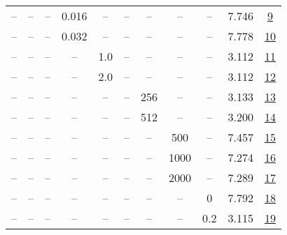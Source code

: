 \begin{table}[H]
\begin{tabular}{ccccccccccc}
-- & -- & -- & 0.016 & -- & -- & -- & -- & -- & 7.746 & \href{https://wandb.ai/stanford-mercury/optimizer-scaling/runs/sweep-520m-10B-mini743375lr0.016-wd0.1-minlr0-warmup4000-b10.9-b-71d93a}{9} \\
-- & -- & -- & 0.032 & -- & -- & -- & -- & -- & 7.778 & \href{https://wandb.ai/stanford-mercury/optimizer-scaling/runs/sweep-520m-10B-mini616d96lr0.032-wd0.1-minlr0-warmup4000-b10.9-b-6809c5}{10} \\
-- & -- & -- & -- & 1.0 & -- & -- & -- & -- & 3.112 & \href{https://wandb.ai/stanford-mercury/optimizer-scaling/runs/sweep-520m-10B-mini0dcb2clr0.004-wd0.1-minlr0-warmup4000-b10.9-b-87a5de}{11} \\
-- & -- & -- & -- & 2.0 & -- & -- & -- & -- & 3.112 & \href{https://wandb.ai/stanford-mercury/optimizer-scaling/runs/sweep-520m-10B-mini515ac5lr0.004-wd0.1-minlr0-warmup4000-b10.9-b-6bf049}{12} \\
-- & -- & -- & -- & -- & -- & 256 & -- & -- & 3.133 & \href{https://wandb.ai/stanford-mercury/optimizer-scaling/runs/sweep-520m-10B-minib57861lr0.004-wd0.1-minlr0-warmup4000-b10.9-b-a05b39}{13} \\
-- & -- & -- & -- & -- & -- & 512 & -- & -- & 3.200 & \href{https://wandb.ai/stanford-mercury/optimizer-scaling/runs/sweep-520m-10B-mini05d195lr0.004-wd0.1-minlr0-warmup4000-b10.9-b-f943f3}{14} \\
-- & -- & -- & -- & -- & -- & -- & 500 & -- & 7.457 & \href{https://wandb.ai/stanford-mercury/optimizer-scaling/runs/sweep-520m-10B-mini7194dalr0.004-wd0.1-minlr0-warmup500-b10.9-b2-4a47f7}{15} \\
-- & -- & -- & -- & -- & -- & -- & 1000 & -- & 7.274 & \href{https://wandb.ai/stanford-mercury/optimizer-scaling/runs/sweep-520m-10B-mini358c33lr0.004-wd0.1-minlr0-warmup1000-b10.9-b-ac8e20}{16} \\
-- & -- & -- & -- & -- & -- & -- & 2000 & -- & 7.289 & \href{https://wandb.ai/stanford-mercury/optimizer-scaling/runs/sweep-520m-10B-mini5326c8lr0.004-wd0.1-minlr0-warmup2000-b10.9-b-df18d8}{17} \\
-- & -- & -- & -- & -- & -- & -- & -- & 0 & 7.792 & \href{https://wandb.ai/stanford-mercury/optimizer-scaling/runs/sweep-520m-10B-minia9054blr0.004-wd0-minlr0-warmup4000-b10.9-b20-1ef9ff}{18} \\
-- & -- & -- & -- & -- & -- & -- & -- & 0.2 & 3.115 & \href{https://wandb.ai/stanford-mercury/optimizer-scaling/runs/sweep-520m-10B-mini52759flr0.004-wd0.2-minlr0-warmup4000-b10.9-b-8078e5}{19} \\
\bottomrule
\end{tabular}
\end{table}

